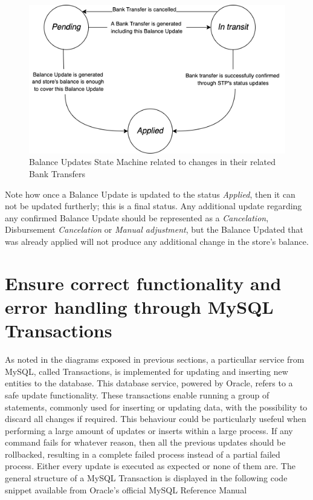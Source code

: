 \begin{figure} [H]
    \centering
    \includegraphics[scale = 0.6]{assets/diagrams/BUStatusStateMachine.png}
    \caption{Balance Updates State Machine related to changes in their related Bank Transfers}\label{fig:bu_state_machine}
\end{figure}

Note how once a Balance Update is updated to the status \textit{Applied}, then it can not be updated furtherly; this is a final status. Any additional update regarding any confirmed Balance Update should be represented as a \textit{Cancelation}, Disbursement \textit{Cancelation} or \textit{Manual adjustment}, but the Balance Updated that was already applied will not produce any additional change in the store's balance.


\section{Ensure correct functionality and error handling through MySQL Transactions}

As noted in the diagrams exposed in previous sections, a particullar service from MySQL, called Transactions, is implemented for updating and inserting new entities to the database. This database service, powered by Oracle, refers to a safe update functionality. These transactions enable running a group of statements, commonly used for inserting or updating data, with the possibility to discard all changes if required. This behaviour could be particularly usefeul when performing a large amount of updates or inserts within a large process. If any command fails for whatever reason, then all the previous updates should be rollbacked, resulting in a complete failed process instead of a partial failed process. Either every update is executed as expected or none of them are. The general structure of a MySQL Transaction is displayed in the following code snippet available from Oracle's official MySQL Reference Manual \cite{mysqldocs}

